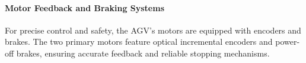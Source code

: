 \documentclass[../../main]{subfiles}
\begin{document}

    
    
\newpage

\paragraph{Motor Feedback and Braking Systems}
For precise control and safety, the AGV's motors are equipped with encoders and brakes. 
The two primary motors feature optical incremental encoders and power-off brakes, 
ensuring accurate feedback and reliable stopping mechanisms.
\end{document}
